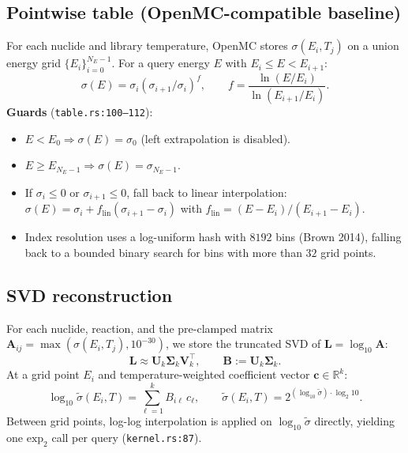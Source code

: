 \documentclass[11pt,a4paper]{article}
\begin{document}
\subsection{Pointwise table (OpenMC-compatible baseline)}

For each nuclide and library temperature, OpenMC stores
$\sigma(E_i, T_j)$ on a union energy grid
$\{E_i\}_{i=0}^{N_E - 1}$. For a query energy $E$ with
$E_i \leq E < E_{i+1}$:
\begin{equation}
\sigma(E) = \sigma_i \left(\sigma_{i+1}/\sigma_i\right)^{f}, \qquad
f = \frac{\ln(E/E_i)}{\ln(E_{i+1}/E_i)}.
\label{eq:loglog}
\end{equation}
\textbf{Guards} (\texttt{table.rs:100--112}):
\begin{itemize}
  \item $E < E_0 \Rightarrow \sigma(E) = \sigma_0$ (left extrapolation is disabled).
  \item $E \geq E_{N_E - 1} \Rightarrow \sigma(E) = \sigma_{N_E - 1}$.
  \item If $\sigma_i \leq 0$ or $\sigma_{i+1} \leq 0$, fall back to
  linear interpolation:
  $\sigma(E) = \sigma_i + f_\text{lin} (\sigma_{i+1} - \sigma_i)$
  with $f_\text{lin} = (E - E_i)/(E_{i+1} - E_i)$.
  \item Index resolution uses a log-uniform hash with
  $8192$ bins (Brown 2014), falling back to a bounded binary
  search for bins with more than $32$ grid points.
\end{itemize}

\subsection{SVD reconstruction}

For each nuclide, reaction, and the pre-clamped matrix
$\mathbf{A}_{ij} = \max(\sigma(E_i, T_j), 10^{-30})$, we store
the truncated SVD of $\mathbf{L} = \log_{10} \mathbf{A}$:
\begin{equation}
\mathbf{L} \approx \mathbf{U}_k \boldsymbol{\Sigma}_k \mathbf{V}_k^\top,
\qquad
\mathbf{B} := \mathbf{U}_k \boldsymbol{\Sigma}_k.
\end{equation}
At a grid point $E_i$ and temperature-weighted coefficient vector
$\mathbf{c} \in \mathbb{R}^k$:
\begin{equation}
\log_{10} \tilde\sigma(E_i, T) = \sum_{\ell = 1}^{k} B_{i\ell}\, c_\ell,
\qquad
\tilde\sigma(E_i, T) = 2^{\left(\log_{10}\tilde\sigma\right)\cdot \log_2 10}.
\label{eq:svd_eval}
\end{equation}
Between grid points, log-log interpolation is applied on
$\log_{10} \tilde\sigma$ directly, yielding one $\mathrm{exp}_2$ call
per query (\texttt{kernel.rs:87}).
\end{document}
